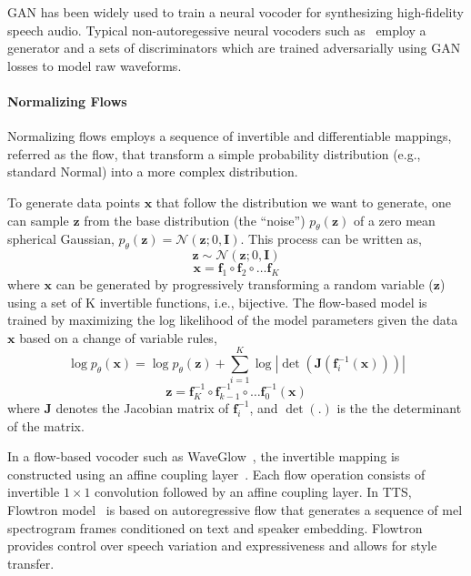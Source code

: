 GAN has been widely used to train a neural vocoder for synthesizing high-fidelity speech audio. Typical non-autoregessive neural vocoders such as~\cite{melgan, hifigan, parallelgan} employ a generator and a sets of discriminators which are trained adversarially using GAN losses to model raw waveforms.

\paragraph{Normalizing Flows}

Normalizing flows employs a sequence of invertible and differentiable mappings, referred as the flow, that transform a simple probability distribution (e.g., standard Normal) into a more complex distribution.

To generate data points $\boldsymbol{x}$ that follow the distribution we want to generate, one can sample $\boldsymbol{z}$ from the base distribution (the “noise”) $p_{\theta}(\boldsymbol{z})$ of a zero mean spherical Gaussian, $p_{\theta}(\boldsymbol{z}) = \mathcal{N}(\boldsymbol{z};0,\boldsymbol{I})$. This process can be written as,
\begin{equation}
   \boldsymbol{z} \sim \mathcal{N}(\boldsymbol{z};0,\boldsymbol{I})
\end{equation}
\begin{equation}
   \boldsymbol{x} = \boldsymbol{f}_{1} \circ \boldsymbol{f}_{2} \circ \ldots \boldsymbol{f}_{K} %
\end{equation}
where $\boldsymbol{x}$ can be generated by progressively transforming a random variable ($\boldsymbol{z}$) using a set of K invertible  functions, i.e., bijective. The flow-based model is trained by maximizing the log likelihood of the model parameters given the data $\boldsymbol{x}$ based on a change of variable rules,
\begin{equation}
    \log p_{\theta}(\boldsymbol{x}) = \log p_{\theta}(\boldsymbol{z}) + \sum_{i=1}^{K} \log |\det(\boldsymbol{J}(\boldsymbol{f}_{i}^{-1}(\boldsymbol{x})))|
    \end{equation}
\begin{equation}
    \boldsymbol{z} = \boldsymbol{f}_{K}^{-1} \circ \boldsymbol{f}_{k-1}^{-1} \circ \ldots \boldsymbol{f}_{0}^{-1}(\boldsymbol{x})
\end{equation}
where $\boldsymbol{J}$ denotes the Jacobian matrix of $\boldsymbol{f}_{i}^{-1}$, and $\det(.)$ is the the determinant of the matrix.

In a flow-based vocoder such as WaveGlow~\cite{waveglow}, the invertible mapping is constructed using an affine coupling layer~\cite{realnvp}. Each flow operation consists of invertible $1 \times 1$ convolution followed by an affine coupling layer. %
In TTS, Flowtron model~\cite{flowtron} is based on autoregressive flow that generates a sequence of mel spectrogram frames conditioned on text and speaker embedding. Flowtron provides control over speech variation and expressiveness and allows for style transfer.



